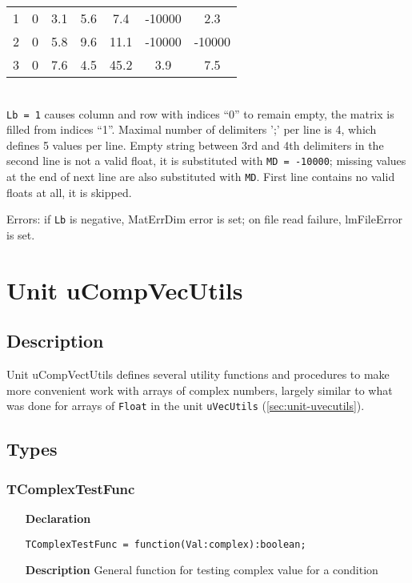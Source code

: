 \documentclass[12pt,a4paper,oneside]{report}
\newcommand{\lmathsix}[1]{   %
	\marginpar{\vspace{#1} 
		\begin{flushright}
			LMath 0.6
	\end{flushright} }
}
\newcommand{\declarationitem}[1]{\textbf{#1}}
\newcommand{\descriptiontitle}[1]{\textbf{#1}}
\newcommand{\code}[1]{\texttt{#1}}
\begin{document}
\begin{itemize}
\begin{tabular}{c|cccccc}
		1 & 0 & 3.1 & 5.6 & 7.4 & -10000 & 2.3 \\ 
		
		2 & 0 & 5.8 & 9.6 & 11.1 & -10000 & -10000 \\ 
		
		3 & 0 & 7.6 & 4.5 & 45.2 & 3.9 & 7.5 \\ 
	\end{tabular} \\  \vskip 2pt
	\code{Lb = 1} causes column and row with indices ``0'' to remain empty, the matrix is filled from indices ``1''. Maximal number of delimiters ';' per line is 4, which defines 5 values per line. Empty string between 3rd and 4th delimiters in the second line is not a valid float, it is substituted with \code{MD = -10000}; missing values at the end of next line are also substituted with \code{MD}. First line contains no valid floats at all, it is skipped.
	
	Errors: if \code{Lb} is negative, MatErrDim error is set; on file read failure, lmFileError is set. 
\end{itemize}	
\section{Unit uCompVecUtils}\lmathsix{-28pt}
\label{ucompvecutils}
\subsection{Description}
Unit uCompVectUtils defines several utility functions and procedures to make more convenient work with arrays of complex numbers, largely similar to what was done for arrays of \code{Float} in the unit \code{uVecUtils} (\ref{sec:unit-uvecutils}).
\subsection{Types}
\subsubsection{TComplexTestFunc}
\label{tcomplextestfunc}
\begin{itemize}
	\item[\declarationitem{Declaration}\hfill]
	\begin{flushleft}
	\code{TComplexTestFunc = function(Val:complex):boolean;}	
	\end{flushleft}
	\item[\descriptiontitle{Description}]
  General function for testing complex value for a condition
\end{itemize}	
\end{document}
